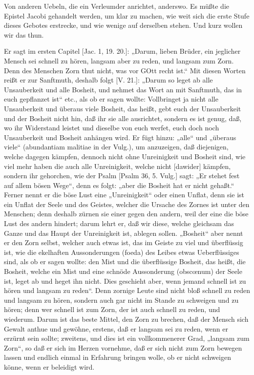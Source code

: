 Von anderen Uebeln, die ein Verleumder anrichtet, anderswo. Es müßte die Epistel Jacobi gehandelt werden, um klar zu machen, wie weit sich die erste Stufe dieses Gebotes erstrecke, und wie wenige auf derselben stehen. Und kurz wollen wir das thun.

Er sagt im ersten Capitel [Jac. 1, 19. 20.]: „Darum, lieben Brüder, ein jeglicher Mensch sei schnell zu hören, langsam aber zu reden, und langsam zum Zorn. Denn des Menschen Zorn thut nicht, was vor GOtt recht ist.“ Mit diesen Worten reißt er zur Sanftmuth, deshalb folgt [V. 21.]: „Darum so leget ab alle Unsauberkeit und alle Bosheit, und nehmet das Wort an mit Sanftmuth, das in euch gepflanzet ist“ etc., als ob er sagen wollte: Vollbringet ja nicht alle Unsauberkeit und überaus viele Bosheit, das heißt, gebt euch der Unsauberkeit und der Bosheit nicht hin, daß ihr sie alle ausrichtet, sondern es ist genug, daß, wo ihr Widerstand leistet und dieselbe von euch werfet, euch doch noch Unsauberkeit und Bosheit anhängen wird. Er fügt hinzu: „alle“ und „überaus viele“ (abundantiam malitiae in der Vulg.), um anzuzeigen, daß diejenigen, welche dagegen kämpfen, dennoch nicht ohne Unreinigkeit und Bosheit sind, wie viel mehr haben die auch alle Unreinigkeit, welche nicht [dawider] kämpfen, sondern ihr gehorchen, wie der Psalm [Psalm 36, 5. Vulg.] sagt: „Er stehet fest auf allem bösen Wege“, denn es folgt: „aber die Bosheit hat er nicht gehaßt.“ Ferner nennt er die böse Lust eine „Unreinigkeit“ oder einen Unflat, denn sie ist ein Unflat der Seele und des Geistes, welcher die Ursache des Zornes ist unter den Menschen; denn deshalb zürnen sie einer gegen den andern, weil der eine die böse Lust des andern hindert; darum lehrt er, daß wir diese, welche gleichsam das Ganze und das Haupt der Unreinigkeit ist, ablegen sollen. „Bosheit“ aber nennt er den Zorn selbst, welcher auch etwas ist, das im Geiste zu viel und überflüssig ist, wie die ekelhaften Aussonderungen (foeda) des Leibes etwas Ueberflüssiges sind, als ob er sagen wollte: den Mist und die überflüssige Bosheit, das heißt, die Bosheit, welche ein Mist und eine schnöde Aussonderung (obscœnum) der Seele ist, leget ab und heget ihn nicht. Dies geschieht aber, wenn jemand schnell ist zu hören und langsam zu reden“. Denn zornige Leute sind nicht bloß schnell zu reden und langsam zu hören, sondern auch gar nicht im Stande zu schweigen und zu hören; denn wer schnell ist zum Zorn, der ist auch schnell zu reden, und wiederum. Darum ist das beste Mittel, den Zorn zu brechen, daß der Mensch sich Gewalt anthue und gewöhne, erstens, daß er langsam sei zu reden, wenn er erzürnt sein sollte; zweitens, und dies ist ein vollkommenerer Grad, „langsam zum Zorn“, so daß er sich im Herzen vornehme, daß er sich nicht zum Zorn bewegen lassen und endlich einmal in Erfahrung bringen wolle, ob er nicht schweigen könne, wenn er beleidigt wird.

